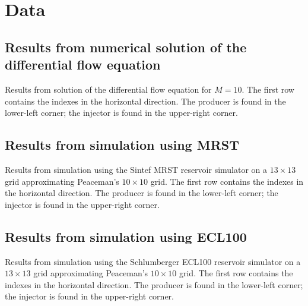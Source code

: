 
\section{Data} %
\label{sec:data}
\subsection{Results from numerical solution of the differential flow equation} %
\label{sub:results_from_numerical_solution_of_the_differential_flow_equation}
Results from solution of the differential flow equation for $M=10$. The first row contains the indexes in the horizontal direction. The producer is found in the lower-left corner; the injector is found in the upper-right corner.

{\tiny
\vspace{.5cm}
\hspace{-1cm}
}

\subsection{Results from simulation using MRST} %
\label{sub:results_from_simulation_using_mrst}
Results from simulation using the Sintef MRST reservoir simulator on a $13\times 13$ grid approximating Peaceman's $10\times 10$ grid. The first row contains the indexes in the horizontal direction. The producer is found in the lower-left corner; the injector is found in the upper-right corner.

{\tiny
\vspace{.5cm}
\hspace{-1cm}
}

\subsection{Results from simulation using ECL100} %
\label{sub:results_from_simulation_using_ecl100_metric}
Results from simulation using the Schlumberger ECL100 reservoir simulator on a $13\times 13$ grid approximating Peaceman's $10\times 10$ grid. The first row contains the indexes in the horizontal direction. The producer is found in the lower-left corner; the injector is found in the upper-right corner.

{\tiny
\vspace{.5cm}
\noindent
{}}

